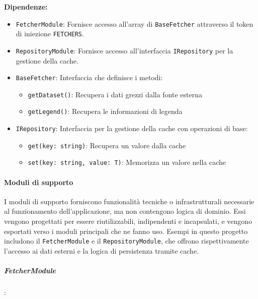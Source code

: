 \textbf{Dipendenze:}
\begin{itemize}
    \item \texttt{FetcherModule}: Fornisce accesso all'array di \texttt{BaseFetcher} attraverso il token di iniezione \texttt{FETCHERS}.
    \item \texttt{RepositoryModule}: Fornisce accesso all'interfaccia \texttt{IRepository} per la gestione della cache.    
    \item \texttt{BaseFetcher}: Interfaccia che definisce i metodi:
    \begin{itemize}
        \item \texttt{getDataset()}: Recupera i dati grezzi dalla fonte esterna
        \item \texttt{getLegend()}: Recupera le informazioni di legenda
    \end{itemize}
    
    \item \texttt{IRepository}: Interfaccia per la gestione della cache con operazioni di base:
    \begin{itemize}
        \item \texttt{get(key: string)}: Recupera un valore dalla cache
        \item \texttt{set(key: string, value: T)}: Memorizza un valore nella cache
    \end{itemize}
\end{itemize}


\paragraph{Moduli di supporto}
I moduli di supporto forniscono funzionalità tecniche o infrastrutturali necessarie al funzionamento dell’applicazione, ma non contengono logica di dominio.
Essi vengono progettati per essere riutilizzabili, indipendenti e incapsulati, e vengono esportati verso i moduli principali che ne fanno uso.
Esempi in questo progetto includono il \texttt{FetcherModule} e il \texttt{RepositoryModule}, che offrono rispettivamente l'accesso ai dati esterni e la logica di persistenza tramite cache.


\subparagraph{FetcherModule}:

